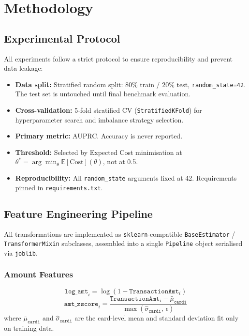 ﻿%

\section{Methodology}
\label{sec:methodology}

\subsection{Experimental Protocol}

All experiments follow a strict protocol to ensure reproducibility and
prevent data leakage:

\begin{itemize}
    \item \textbf{Data split:} Stratified random split: 80\% train / 20\% test,
          \texttt{random\_state=42}. The test set is untouched until final
          benchmark evaluation.
    \item \textbf{Cross-validation:} 5-fold stratified CV (\texttt{StratifiedKFold})
          for hyperparameter search and imbalance strategy selection.
    \item \textbf{Primary metric:} AUPRC. Accuracy is never reported.
    \item \textbf{Threshold:} Selected by Expected Cost minimisation at
          $\theta^* = \arg\min_\theta \mathbb{E}[\text{Cost}](\theta)$,
          not at 0.5.
    \item \textbf{Reproducibility:} All \texttt{random\_state} arguments
          fixed at 42. Requirements pinned in \texttt{requirements.txt}.
\end{itemize}

\subsection{Feature Engineering Pipeline}
\label{sec:features}

All transformations are implemented as \texttt{sklearn}-compatible
\texttt{BaseEstimator} / \texttt{TransformerMixin} subclasses, assembled
into a single \texttt{Pipeline} object serialised via \texttt{joblib}.

\subsubsection{Amount Features}

\[
    \texttt{log\_amt}_i = \log(1 + \texttt{TransactionAmt}_i)
\]
\[
    \texttt{amt\_zscore}_i = \frac{\texttt{TransactionAmt}_i - \bar{\mu}_{\texttt{card1}}}
                                  {\max(\hat{\sigma}_{\texttt{card1}},\, \epsilon)}
\]
where $\bar{\mu}_{\texttt{card1}}$ and $\hat{\sigma}_{\texttt{card1}}$ are
the card-level mean and standard deviation fit only on training data.

